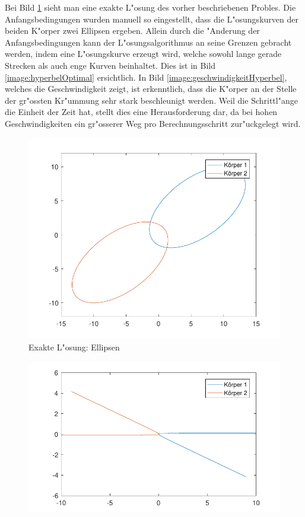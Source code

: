 \begin{refsection}
Bei Bild \ref{image:ellipseOptimal} sieht man eine exakte L"osung des vorher beschriebenen Probles.
Die Anfangsbedingungen wurden manuell so eingestellt, dass die L"osungskurven der beiden K"orper zwei Ellipsen ergeben.
Allein durch die "Anderung der Anfangsbedingungen kann der L"osungsalgorithmus an seine Grenzen gebracht werden, indem eine L"osungskurve erzeugt wird, welche sowohl lange gerade Strecken als auch enge Kurven beinhaltet.
Dies ist in Bild \ref{image:hyperbelOptimal} ersichtlich.
In Bild \ref{image:geschwindigkeitHyperbel}, welches die Geschwindigkeit zeigt, ist erkenntlich, dass die K"orper an der Stelle der gr"ossten Kr"ummung sehr stark beschleunigt werden.
Weil die Schrittl"ange die Einheit der Zeit hat, stellt dies eine Herausforderung dar, da bei hohen Geschwindigkeiten ein gr"osserer Weg pro Berechnungsschritt zur"uckgelegt wird.
\begin{figure}
\centering
\includegraphics{schrittlaenge/images/ellipseOptimal.pdf}
\caption{Exakte L"osung: Ellipsen}
\label{image:ellipseOptimal}
\end{figure}
\begin{figure}
\centering
\includegraphics{schrittlaenge/images/hyperbelOptimal.pdf}

\end{figure}
\end{refsection}
